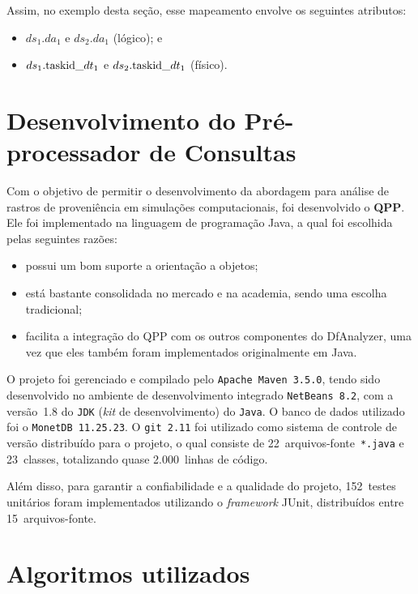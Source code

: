 Assim, no exemplo desta seção, esse mapeamento envolve os seguintes atributos:

\begin{itemize}
    \item \(ds_1.da_1\) e \(ds_2.da_1\) (lógico); e
    \item \(ds_1.\textup{taskid\_}dt_1\) e \(ds_2.\textup{taskid\_}dt_1\) (físico).
\end{itemize}

\section{Desenvolvimento do Pré-processador de Consultas}

Com o objetivo de permitir o desenvolvimento da abordagem para análise de rastros de proveniência em simulações computacionais, foi desenvolvido o \textbf{QPP}. Ele foi implementado na linguagem de programação Java, a qual foi escolhida pelas seguintes razões:

\begin{itemize}
    \item possui um bom suporte a orientação a objetos;
    \item está bastante consolidada no mercado e na academia, sendo uma escolha tradicional;
    \item facilita a integração do QPP com os outros componentes do DfAnalyzer, uma vez que eles também foram implementados originalmente em Java.
\end{itemize}

O projeto foi gerenciado e compilado pelo \texttt{Apache Maven~3.5.0}, tendo sido desenvolvido no ambiente de desenvolvimento integrado \texttt{NetBeans~8.2}, com a versão~1.8 do \texttt{JDK} (\textit{kit} de desenvolvimento) do \texttt{Java}. O banco de dados utilizado foi o \texttt{MonetDB~11.25.23}. O \texttt{git~2.11} foi utilizado como sistema de controle de versão distribuído para o projeto, o qual consiste de
22~arquivos-fonte~\texttt{*.java} e 23~classes, totalizando quase 2.000~linhas de código.

Além disso, para garantir a confiabilidade e a qualidade do projeto, 152~testes unitários foram implementados utilizando o \textit{framework} JUnit, distribuídos entre 15~arquivos-fonte.

\section{Algoritmos utilizados}%
\label{sec:algoritmos-utilizados}

